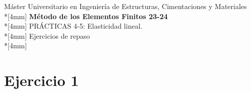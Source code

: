 \documentclass[a4paper,12pt]{article}
\begin{document}
\def\imagebox#1#2{\vtop to #1{\null\hbox{#2}\vfill}}
\def\bm#1{{\mbox{\boldmath $#1$}}}
\def\eqdef{\buildrel \rm def \over =}
\def\signo{\mathop{\rm signo}\nolimits}

\makeatletter
\newcommand{\mybox}[1]{%
  \setbox0=\hbox{#1}%
  \setlength{\@tempdima}{\dimexpr\wd0+13pt}%
  \begin{tcolorbox}[colframe=mycolor,boxrule=0.5pt,arc=4pt,
      left=6pt,right=6pt,top=6pt,bottom=6pt,boxsep=0pt,width=\@tempdima]
    #1
  \end{tcolorbox}
}
\makeatother



\mbox{}\vspace*{-20mm}

{\centering
{\small\sc %
Máster Universitario en Ingeniería de Estructuras, Cimentaciones y Materiales}\\*[4mm]
{\Large\bf Método de los Elementos Finitos 23-24}\\*[4mm]
PRÁCTICAS 4-5: Elasticidad lineal. \\*[4mm]
Ejercicios de repaso \\*[4mm]
}

\section{Ejercicio 1}
\end{document}
